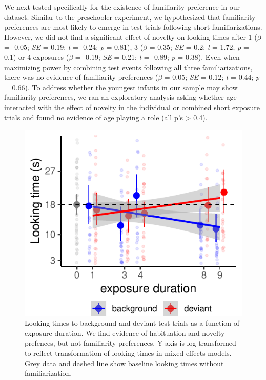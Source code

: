 \documentclass[10pt, letterpaper]{article}
\newenvironment{CodeChunk}{}{}
\begin{document}
We next tested specifically for the existence of familiarity preference
in our dataset. Similar to the preschooler experiment, we hypothesized
that familiarity preferences are most likely to emerge in test trials
following short familiarizations. However, we did not find a significant
effect of novelty on looking times after 1 (\(\beta\) = -0.05; \emph{SE}
= 0.19; \emph{t} = -0.24; \emph{p} = 0.81), 3 (\(\beta\) = 0.35;
\emph{SE} = 0.2; \emph{t} = 1.72; \emph{p} = 0.1) or 4 exposures
(\(\beta\) = -0.19; \emph{SE} = 0.21; \emph{t} = -0.89; \emph{p} =
0.38). Even when maximizing power by combining test events following all
three familiarizations, there was no evidence of familiarity preferences
(\(\beta\) = 0.05; \emph{SE} = 0.12; \emph{t} = 0.44; \emph{p} = 0.66).
To address whether the youngest infants in our sample may show
familiarity preferences, we ran an exploratory analysis asking whether
age interacted with the effect of novelty in the individual or combined
short exposure trials and found no evidence of age playing a role (all
p's \textgreater{} 0.4).

\captionsetup{belowskip=0pt,aboveskip=4pt}

\begin{CodeChunk}
\begin{figure}[h]

\includegraphics{figs/infant_results-1} \hfill{}

\caption[Looking times to background and deviant test trials as a function of exposure duration]{Looking times to background and deviant test trials as a function of exposure duration. We find evidence of habituation and novelty prefences, but not familiarity preferences. Y-axis is log-transformed to reflect transformation of looking times in mixed effects models. Grey data and dashed line show baseline looking times without familiarization.}\label{fig:infant_results}
\end{figure}
\end{CodeChunk}
\end{document}

